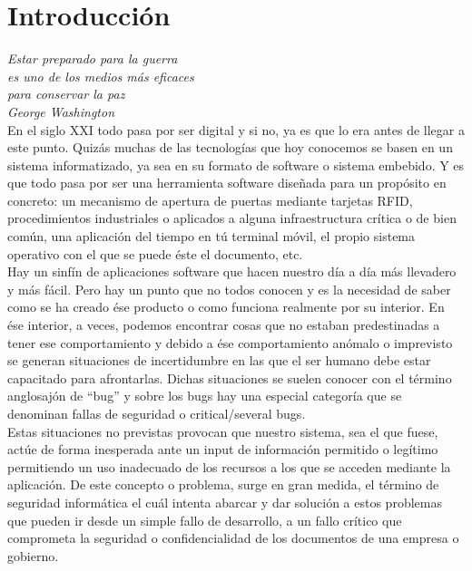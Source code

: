 \chapter{Introducción}
\label{chap:introducción}

\emph{Estar preparado para la guerra\\ es uno de los medios más eficaces\\ para conservar la paz\\ George Washington}\\

En el siglo XXI todo pasa por ser digital y si no, ya es que lo era antes de llegar a este punto. Quizás muchas de las tecnologías que hoy conocemos se basen en un sistema informatizado, ya sea en su formato de software o sistema embebido. Y es que todo pasa por ser una herramienta software diseñada para un propósito en concreto: un mecanismo de apertura de puertas mediante tarjetas RFID, procedimientos industriales o aplicados a alguna infraestructura crítica o de bien común, una aplicación del tiempo en tú terminal móvil, el propio sistema operativo con el que se puede éste el documento, etc. \\

Hay un sinfín de aplicaciones software que hacen nuestro día a día más llevadero y más fácil. Pero hay un punto que no todos conocen y es la necesidad de saber como se ha creado ése producto o como funciona realmente por su interior. En ése interior, a veces, podemos encontrar cosas que no estaban predestinadas a tener ese comportamiento y debido a ése comportamiento anómalo o imprevisto se generan situaciones de incertidumbre en las que el ser humano debe estar capacitado para afrontarlas. Dichas situaciones se suelen conocer con el término anglosajón de ``bug'' y sobre los bugs hay una especial categoría que se denominan fallas de seguridad o critical/several bugs. \\

Estas situaciones no previstas provocan que nuestro sistema, sea el que fuese, actúe de forma inesperada ante un input de información permitido o legítimo permitiendo un uso inadecuado de los recursos a los que se acceden mediante la aplicación. De este concepto o problema, surge en gran medida, el término de seguridad informática el cuál intenta abarcar y dar solución a estos problemas que pueden ir desde un simple fallo de desarrollo, a un fallo crítico que comprometa la seguridad o confidencialidad de los documentos de una empresa o gobierno. \\

